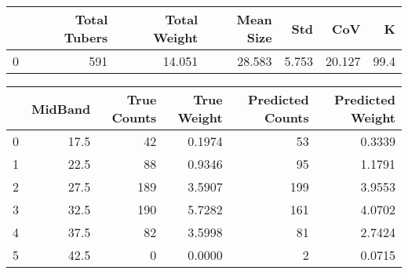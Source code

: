 \begin{tabular}{lrrrrrr}
\toprule
{} &  Total Tubers &  Total Weight &  Mean Size &    Std &     CoV &     K \\
\midrule
0 &           591 &        14.051 &     28.583 &  5.753 &  20.127 &  99.4 \\
\bottomrule
\end{tabular}

\begin{tabular}{lrrrrr}
\toprule
{} &  MidBand &  True Counts &  True Weight &  Predicted Counts &  Predicted Weight \\
\midrule
0 &     17.5 &           42 &       0.1974 &                53 &            0.3339 \\
1 &     22.5 &           88 &       0.9346 &                95 &            1.1791 \\
2 &     27.5 &          189 &       3.5907 &               199 &            3.9553 \\
3 &     32.5 &          190 &       5.7282 &               161 &            4.0702 \\
4 &     37.5 &           82 &       3.5998 &                81 &            2.7424 \\
5 &     42.5 &            0 &       0.0000 &                 2 &            0.0715 \\
\bottomrule
\end{tabular}

